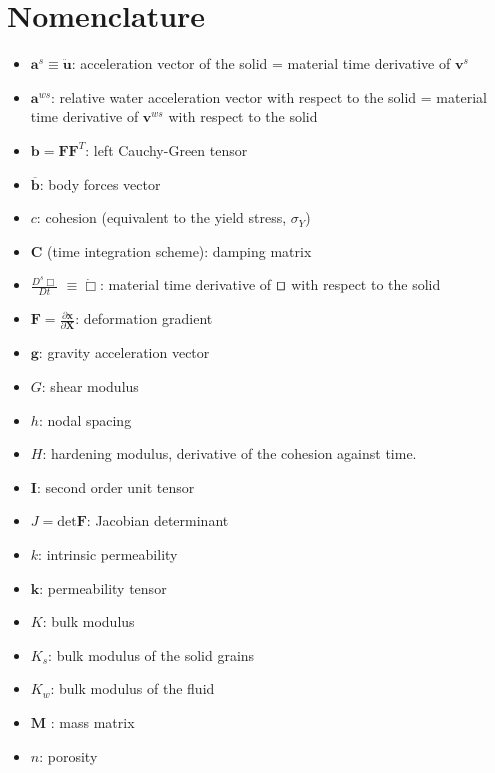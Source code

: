\documentclass[twocolumn]{svjour3}          %
\begin{document}


\section*{Nomenclature}
\label{nom}

\begin{itemize}
\item $\boldsymbol{a}^s \equiv \boldsymbol{\ddot{u}}$: acceleration vector of the solid = material time derivative of $\boldsymbol{v}^s$
\item $\boldsymbol{a}^{ws}$: relative water acceleration vector with respect to the solid = material time derivative of $\boldsymbol{v}^{ws}$ with respect to the solid 
\item $\boldsymbol{b}=\boldsymbol{F}\boldsymbol{F}^{T}$: left Cauchy-Green tensor
\item $\boldsymbol{\overline{b}}$: body forces vector
\item $c$: cohesion (equivalent to the yield stress, $\sigma_Y$)
\item $\boldsymbol{C}$ (time integration scheme): damping matrix
\item $\frac{D^s\Box}{Dt}$ $\equiv \dot\Box$: material time derivative of $\qed$ with respect to the solid
\item $\boldsymbol{F}=\frac{\partial\boldsymbol{x}}{\partial\boldsymbol{X}}$: deformation gradient
\item $\boldsymbol{g}$: gravity acceleration vector
\item $G$: shear modulus
\item $h$: nodal spacing
\item $H$: hardening modulus, derivative of the cohesion against time.
\item $\boldsymbol{I}$: second order unit tensor
\item $J=\mbox{det}\boldsymbol{F}$: Jacobian determinant
\item $k$: intrinsic permeability
\item $\boldsymbol{k}$: permeability tensor
\item $K$: bulk modulus
\item $K_s$: bulk modulus of the solid grains
\item $K_w$: bulk modulus of the fluid
\item $\boldsymbol{M}$ : mass matrix
\item $n$: porosity

\end{itemize}
\end{document}
